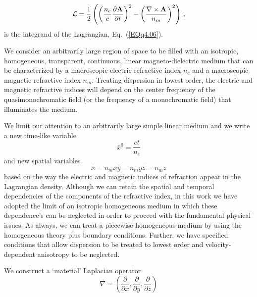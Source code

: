 \documentclass[twocolumn,amssymb,eqsecnum,aps,pra]{revtex4-2}
\begin{document}
\begin{equation}
{\cal L}=\frac{1}{2}\left (
\left (
\frac{n_e}{c}\frac{\partial{\bf A}}{\partial t}
\right )^2
- \left (\frac{\nabla\times{\bf A}}{n_m} \right )^2
\right ) \, ,
\label{EQq4.07}
\end{equation}
is the integrand of the Lagrangian, Eq.~(\ref{EQq4.06}).
\par
We consider an arbitrarily large region of space to be filled with an
isotropic, homogeneous, transparent, continuous, linear
magneto-dielectric medium that can be characterized by a macroscopic
electric refractive index $n_e$ and a macroscopic magnetic refractive
index $n_m$.
Treating dispersion in lowest order, the electric and magnetic
refractive indices will depend on the center frequency of the
quasimonochromatic field (or the frequency of a monochromatic field)
that illuminates the medium. 
\par
We limit our attention to an arbitrarily large simple linear medium and
we write a new time-like variable
\begin{equation}
\bar x^0=\frac{ct}{n_e}
\label{EQq4.08}
\end{equation}
and new spatial variables
\begin{subequations}
\begin{equation}
\bar x=n_m x
\label{EQq4.09a}
\end{equation}
\begin{equation}
\bar y=n_m y
\label{EQq4.09b}
\end{equation}
\begin{equation}
\bar z=n_m z 
\label{EQq4.09c}
\end{equation}
\label{EQq4.09}
\end{subequations}
based on the way the electric and magnetic indices of refraction 
appear in the Lagrangian density.
Although we can retain the spatial and temporal dependencies of the
components of the refractive index, in this work we have adopted the 
limit of an isotropic homogeneous medium in which these dependence's can
be neglected in order to proceed with the fundamental physical issues.
As always, we can treat a piecewise homogeneous medium by using the
homogeneous theory plus boundary conditions.
Further, we have specified conditions that allow dispersion to be
treated to lowest order and velocity-dependent anisotropy to be
neglected.
\par
We construct a `material' Laplacian operator 
\begin{equation}
\bar \nabla = 
\left ( \frac{\partial}{\partial \bar x},
\frac{\partial}{\partial \bar y},
\frac{\partial}{\partial \bar z} \right ) 
\label{EQq4.10}
\end{equation}
\end{document}
